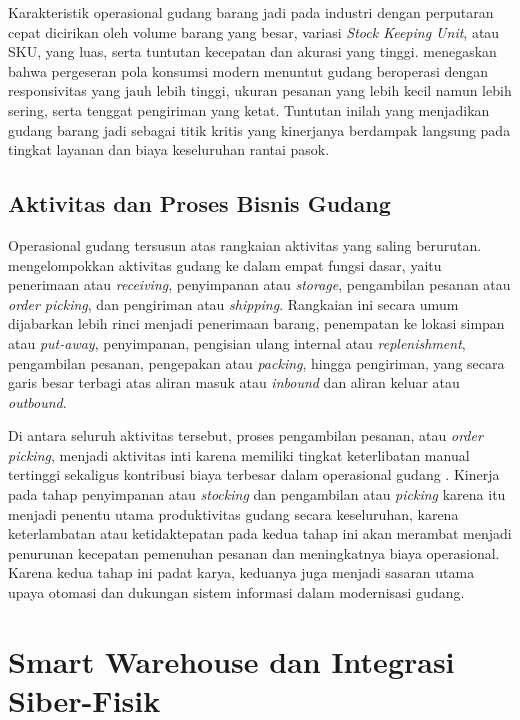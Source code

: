 Karakteristik operasional gudang barang jadi pada industri dengan perputaran cepat dicirikan oleh volume barang yang besar, variasi \textit{Stock Keeping Unit}, atau SKU, yang luas, serta tuntutan kecepatan dan akurasi yang tinggi. \textcite{boysen2019} menegaskan bahwa pergeseran pola konsumsi modern menuntut gudang beroperasi dengan responsivitas yang jauh lebih tinggi, ukuran pesanan yang lebih kecil namun lebih sering, serta tenggat pengiriman yang ketat. Tuntutan inilah yang menjadikan gudang barang jadi sebagai titik kritis yang kinerjanya berdampak langsung pada tingkat layanan dan biaya keseluruhan rantai pasok.

\subsection{Aktivitas dan Proses Bisnis Gudang}

Operasional gudang tersusun atas rangkaian aktivitas yang saling berurutan. \textcite{gu2007} mengelompokkan aktivitas gudang ke dalam empat fungsi dasar, yaitu penerimaan atau \textit{receiving}, penyimpanan atau \textit{storage}, pengambilan pesanan atau \textit{order picking}, dan pengiriman atau \textit{shipping}. Rangkaian ini secara umum dijabarkan lebih rinci menjadi penerimaan barang, penempatan ke lokasi simpan atau \textit{put-away}, penyimpanan, pengisian ulang internal atau \textit{replenishment}, pengambilan pesanan, pengepakan atau \textit{packing}, hingga pengiriman, yang secara garis besar terbagi atas aliran masuk atau \textit{inbound} dan aliran keluar atau \textit{outbound}.

Di antara seluruh aktivitas tersebut, proses pengambilan pesanan, atau \textit{order picking}, menjadi aktivitas inti karena memiliki tingkat keterlibatan manual tertinggi sekaligus kontribusi biaya terbesar dalam operasional gudang \autocite{boysen2019}. Kinerja pada tahap penyimpanan atau \textit{stocking} dan pengambilan atau \textit{picking} karena itu menjadi penentu utama produktivitas gudang secara keseluruhan, karena keterlambatan atau ketidaktepatan pada kedua tahap ini akan merambat menjadi penurunan kecepatan pemenuhan pesanan dan meningkatnya biaya operasional. Karena kedua tahap ini padat karya, keduanya juga menjadi sasaran utama upaya otomasi dan dukungan sistem informasi dalam modernisasi gudang.

\section{Smart Warehouse dan Integrasi Siber-Fisik}
\label{sec:smart-warehouse}

